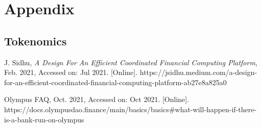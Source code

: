 \documentclass{article}
\begin{document}
\section{Appendix}

\subsection{Tokenomics}
\label{section:tokenomics}

\lipsum[1-1]

\begin{thebibliography}{1}



 J. Sidhu, \textit{A Design For An Efficient Coordinated Financial Computing Platform}, Feb. 2021, Accessed on: Jul 2021. [Online]. https://jsidhu.medium.com/a-design-for-an-efficient-coordinated-financial-computing-platform-ab27e8a825a0


 Olympus FAQ, Oct. 2021, Accessed on: Oct 2021. [Online]. https://docs.olympusdao.finance/main/basics/basics\#what-will-happen-if-there-is-a-bank-run-on-olympus




\end{thebibliography}
\end{document}
